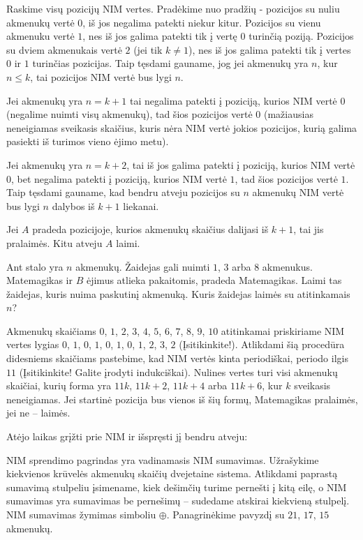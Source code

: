 \begin{sprendimas}
  Raskime visų pozicijų NIM vertes. Pradėkime nuo pradžių - pozicijos su
  nuliu akmenukų vertė $0$, iš jos negalima patekti niekur kitur.
  Pozicijos su vienu akmenuku vertė $1$, nes iš jos galima patekti tik į
  vertę $0$ turinčią poziją. Pozicijos su dviem akmenukais
  vertė $2$ (jei tik $k \neq 1$), nes iš jos galima patekti tik į vertes
  $0$ ir $1$ turinčias pozicijas. Taip tęsdami gauname, jog
  jei akmenukų yra $n$, kur $n \leq k$, tai pozicijos NIM vertė bus lygi
  $n$.

  Jei akmenukų yra $n=k+1$ tai negalima patekti į poziciją, kurios NIM vertė
  $0$ (negalime nuimti visų akmenukų), tad šios pozicijos vertė $0$
  (mažiausias neneigiamas sveikasis skaičius, kuris nėra NIM vertė jokios
  pozicijos, kurią galima pasiekti iš turimos vieno ėjimo metu).

  Jei akmenukų yra $n=k+2$, tai iš jos galima patekti į poziciją, kurios NIM
  vertė $0$, bet negalima patekti į poziciją, kurios NIM vertė $1$, tad šios
  pozicijos vertė $1$. Taip tęsdami gauname, kad bendru atveju pozicijos su
  $n$ akmenukų NIM vertė bus lygi $n$ dalybos iš $k+1$ liekanai.

  Jei $A$ pradeda pozicijoje, kurios akmenukų
  skaičius dalijasi iš $k+1$, tai jis pralaimės.
  Kitu atveju $A$ laimi.
\end{sprendimas}

\begin{pavnr}
  Ant stalo yra $n$ akmenukų. Žaidejas gali nuimti $1$, $3$ arba $8$ akmenukus.
  Matemagikas ir $B$ ėjimus atlieka pakaitomis, pradeda Matemagikas. Laimi tas
  žaidejas, kuris nuima paskutinį akmenuką. Kuris žaidejas laimės su
  atitinkamais $n$?
\end{pavnr}

Akmenukų skaičiams $0$, $1$, $2$, $3$, $4$, $5$, $6$, $7$, $8$, $9$, $10$
atitinkamai priskiriame NIM vertes lygias $0$, $1$, $0$, $1$, $0$, $1$,
$0$, $1$, $2$, $3$, $2$ (Įsitikinkite!). Atlikdami šią procedūra didesniems
skaičiams pastebime, kad NIM vertės kinta periodiškai, periodo ilgis $11$
(Įsitikinkite! Galite įrodyti indukciškai). Nulines vertes turi visi
akmenukų skaičiai, kurių forma yra $11k$, $11k+2$, $11k+4$ arba $11k+6$,
kur $k$ sveikasis neneigiamas. Jei startinė pozicija bus vienos iš šių
formų, Matemagikas pralaimės, jei ne -- laimės.

Atėjo laikas grįžti prie NIM ir išspręsti jį bendru atveju: 

NIM sprendimo pagrindas yra vadinamasis NIM sumavimas. Užrašykime
kiekvienos krūvelės akmenukų skaičių dvejetaine sistema. Atlikdami paprastą
sumavimą stulpeliu įsimename, kiek dešimčių turime pernešti į kitą
eilę, o NIM sumavimas yra sumavimas be pernešimų – sudedame atskirai
kiekvieną stulpelį. NIM sumavimas žymimas simboliu $\oplus$.
Panagrinėkime pavyzdį su  $21$, $17$, $15$ akmenukų. 

